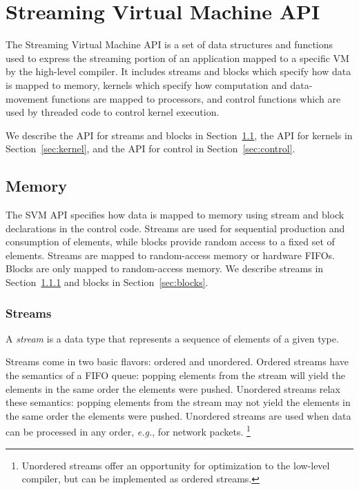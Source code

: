 \section{Streaming Virtual Machine API}

The Streaming Virtual Machine API is a set of data structures and functions used to express the streaming portion of an application mapped to a specific VM by the high-level compiler. It includes streams and blocks which specify how data is mapped to memory, kernels which specify how computation and data-movement functions are mapped to processors, and control functions which are used by threaded code to control kernel execution. 

We describe the API for streams and blocks in Section~\ref{sec:memory}, the API for kernels in Section~\ref{sec:kernel}, and the API for control in Section~\ref{sec:control}.

\subsection{Memory}
\label{sec:memory}

The SVM API specifies how data is mapped to memory using stream and block declarations in the control code.  Streams are used for sequential production and consumption of elements, while blocks provide random access to a fixed set of elements.  Streams are mapped to random-access memory or hardware FIFOs. Blocks are only mapped to random-access memory. We describe streams in Section~\ref{sec:streams} and blocks in Section~\ref{sec:blocks}.

\subsubsection{Streams}
\label{sec:streams}

A {\it stream} is a data type that represents a sequence of elements of a given type. 

Streams come in two basic flavors: ordered and unordered. Ordered streams have the semantics of a FIFO queue: popping elements from the stream will yield the elements in the same order the elements were pushed. Unordered streams relax these semantics: popping elements from the stream may not yield the elements in the same order the elements were pushed. Unordered streams are used when data can be processed in any order, {\it e.g.}, for network packets. \footnote{Unordered streams offer an opportunity for optimization to the low-level compiler, but can be implemented as ordered streams. }

